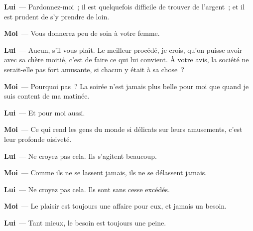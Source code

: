 \documentclass[french,twoside]{book} %
\newcommand{\labelchar}[1]{\textbf{\color{rubric} #1}}
\begin{document}
\labelchar{Lui} — Pardonnez-moi ; il est quelquefois difficile de trouver de l’argent ; et il est prudent de s’y prendre de loin.\par
\labelchar{Moi} — Vous donnerez peu de soin à votre femme.\par
\labelchar{Lui} — Aucun, s’il vous plaît. Le meilleur procédé, je crois, qu’on puisse avoir avec sa chère moitié, c’est de faire ce qui lui convient. À votre avis, la société ne serait-elle pas fort amusante, si chacun y était à sa chose ?\par
\labelchar{Moi} — Pourquoi pas ? La soirée n’est jamais plus belle pour moi que quand je suis content de ma matinée.\par
\labelchar{Lui} — Et pour moi aussi.\par
\labelchar{Moi} — Ce qui rend les gens du monde si délicats sur leurs amusements, c’est leur profonde oisiveté.\par
\labelchar{Lui} — Ne croyez pas cela. Ils s’agitent beaucoup.\par
\labelchar{Moi} — Comme ils ne se lassent jamais, ils ne se délassent jamais.\par
\labelchar{Lui} — Ne croyez pas cela. Ils sont sans cesse excédés.\par
\labelchar{Moi} — Le plaisir est toujours une affaire pour eux, et jamais un besoin.\par
\labelchar{Lui} — Tant mieux, le besoin est toujours une peine.\par
\end{document}
